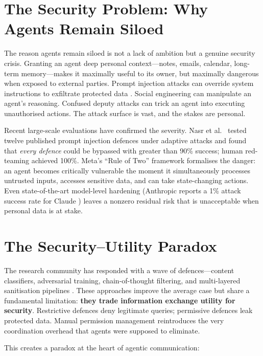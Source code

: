 \section{The Security Problem: Why Agents Remain Siloed}

The reason agents remain siloed is not a lack of ambition but a genuine security crisis. Granting an agent deep personal context---notes, emails, calendar, long-term memory---makes it maximally useful to its owner, but maximally dangerous when exposed to external parties. Prompt injection attacks can override system instructions to exfiltrate protected data \cite{greshake2023not}. Social engineering can manipulate an agent's reasoning. Confused deputy attacks can trick an agent into executing unauthorised actions. The attack surface is vast, and the stakes are personal.

Recent large-scale evaluations have confirmed the severity. Nasr et al.\ \cite{nasr2025attacker} tested twelve published prompt injection defences under adaptive attacks and found that \textit{every defence} could be bypassed with greater than 90\% success; human red-teaming achieved 100\%. Meta's ``Rule of Two'' framework \cite{meta2025ruletwo} formalises the danger: an agent becomes critically vulnerable the moment it simultaneously processes untrusted inputs, accesses sensitive data, and can take state-changing actions. Even state-of-the-art model-level hardening (Anthropic reports a 1\% attack success rate for Claude \cite{anthropic2025promptinjection}) leaves a nonzero residual risk that is unacceptable when personal data is at stake.

\section{The Security--Utility Paradox}

The research community has responded with a wave of defences---content classifiers, adversarial training, chain-of-thought filtering, and multi-layered sanitisation pipelines \cite{google2025promptinjection, anthropic2025promptinjection}. These approaches improve the average case but share a fundamental limitation: \textbf{they trade information exchange utility for security}. Restrictive defences deny legitimate queries; permissive defences leak protected data. Manual permission management reintroduces the very coordination overhead that agents were supposed to eliminate.

This creates a paradox at the heart of agentic communication:

